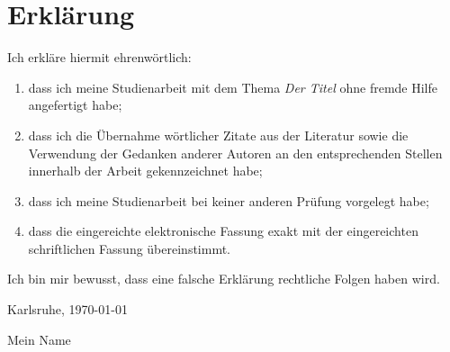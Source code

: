 \thispagestyle{empty}

\section*{Erklärung}

\vspace*{2cm}

Ich erkläre hiermit ehrenwörtlich: \\
\begin{enumerate}
\item dass ich meine Studienarbeit mit dem Thema
{\itshape \glqq Der Titel\grqq } ohne fremde Hilfe angefertigt habe;
\item dass ich die Übernahme wörtlicher Zitate aus der Literatur sowie
  die Verwendung der Gedanken anderer Autoren an den entsprechenden
  Stellen innerhalb der Arbeit gekennzeichnet habe;
\item dass ich meine Studienarbeit bei keiner anderen Prüfung
  vorgelegt habe;
\item dass die eingereichte elektronische Fassung exakt mit der
  eingereichten schriftlichen Fassung übereinstimmt.
\end{enumerate}
Ich bin mir bewusst, dass eine falsche Erklärung rechtliche Folgen
haben wird.

\vspace*{2cm}

Karlsruhe, \today

\vspace*{2cm}

Mein Name
